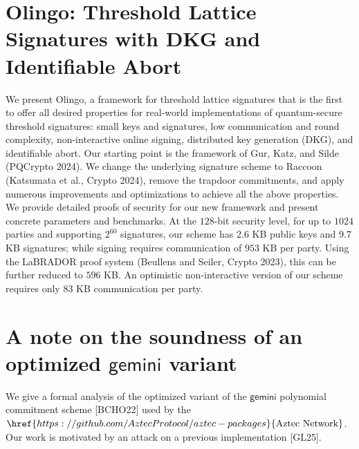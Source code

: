 \documentclass[11pt,oneside]{book}
\theoremstyle{definition}
\theoremstyle{remark}
\theoremstyle{plain}
\begin{document}
 \section{\cite{cryptoeprint:2025/1789} Olingo: Threshold Lattice Signatures with DKG and Identifiable Abort}
 We present Olingo, a framework for threshold lattice signatures that is the first to offer all desired properties for real-world implementations of quantum-secure threshold signatures: small keys and signatures, low communication and round complexity, non-interactive online signing, distributed key generation (DKG), and identifiable abort. Our starting point is the framework of Gur, Katz, and Silde (PQCrypto 2024). We change the underlying signature scheme to Raccoon (Katsumata et al., Crypto 2024), remove the trapdoor commitments, and apply numerous improvements and optimizations to achieve all the above properties. We provide detailed proofs of security for our new framework and present concrete parameters and benchmarks. At the $128$-bit security level, for up to $1024$ parties and supporting $2^{60}$ signatures, our scheme has $2.6$ KB public keys and $9.7$ KB signatures; while signing requires communication of $953$ KB per party. Using the LaBRADOR proof system (Beullens and Seiler, Crypto 2023), this can be further reduced to $596$ KB. An optimistic non-interactive version of our scheme requires only $83$ KB communication per party.
 
\section{\cite{cryptoeprint:2025/1793} A note on the soundness of an optimized $\mathsf{gemini}$ variant}
We give a formal analysis of the optimized variant of the $\mathsf{gemini}$ polynomial commitment scheme [BCHO22] used by the $\href{https://github.com/AztecProtocol/aztec-packages}{\text{Aztec Network}}$. Our work is motivated by an attack on a previous implementation [GL25].
\end{document}
